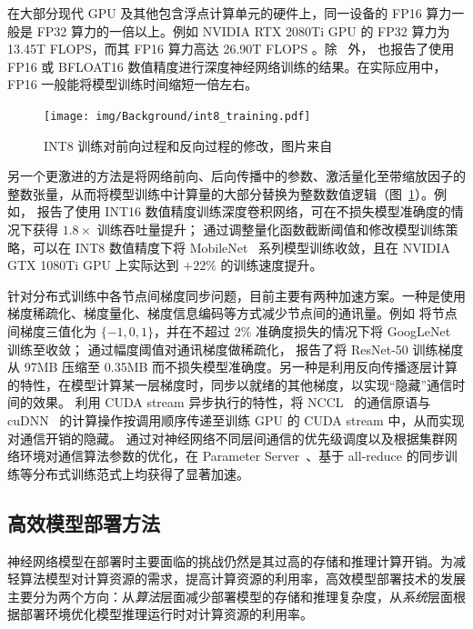 \documentclass[
  fontset = mac,
]{shtthesis}
\begin{document}
在大部分现代 GPU 及其他包含浮点计算单元的硬件上，同一设备的 FP16 算力一般是 FP32 算力的一倍以上。例如 NVIDIA RTX 2080Ti GPU 的 FP32 算力为 13.45T FLOPS，而其 FP16 算力高达 26.90T FLOPS \citep{nvidia2018turing}。除~\citet{micikevicius2018mixed} 外，\citet{abadi2016tensorflow, dean2012large} 也报告了使用 FP16 或 BFLOAT16 数值精度进行深度神经网络训练的结果。在实际应用中，FP16 一般能将模型训练时间缩短一倍左右。

\begin{figure}[htb]
  \centering
  \texttt{[image: img/Background/int8\_training.pdf]}
  \caption{INT8 训练对前向过程和反向过程的修改，图片来自~\citet{zhu2019towards}}
  \label{img::background::int8_training}
\end{figure}

另一个更激进的方法是将网络前向、后向传播中的参数、激活量化至带缩放因子的整数张量，从而将模型训练中计算量的大部分替换为整数数值逻辑（图~\ref{img::background::int8_training}）。例如，\citet{das2018mixed} 报告了使用 INT16 数值精度训练深度卷积网络，可在不损失模型准确度的情况下获得 $1.8\times$ 训练吞吐量提升；\citet{zhu2019towards} 通过调整量化函数截断阈值和修改模型训练策略，可以在 INT8 数值精度下将 MobileNet~\citep{howard2017mobilenets, Sandler_2018} 系列模型训练收敛，且在 NVIDIA GTX 1080Ti GPU 上实际达到 $+22\%$ 的训练速度提升。

针对分布式训练中各节点间梯度同步问题，目前主要有两种加速方案。一种是使用梯度稀疏化、梯度量化、梯度信息编码等方式减少节点间的通讯量。例如 \citet{wen2017terngrad} 将节点间梯度三值化为 $\{-1, 0, 1\}$，并在不超过 $2\%$ 准确度损失的情况下将 GoogLeNet~\citep{szegedy2015going} 训练至收敛；\citet{aji2017sparse, lin2018deep} 通过幅度阈值对通讯梯度做稀疏化，\citet{lin2018deep} 报告了将 ResNet-50 训练梯度从 97MB 压缩至 0.35MB 而不损失模型准确度。另一种是利用反向传播逐层计算的特性，在模型计算某一层梯度时，同步以就绪的其他梯度，以实现“隐藏”通信时间的效果。\citet{abadi2016tensorflow, paszke2019pytorch} 利用 CUDA stream 异步执行的特性，将 NCCL~\citep{jeaugey2017nccl} 的通信原语与 cuDNN~\citep{chetlur2014cudnn} 的计算操作按调用顺序传递至训练 GPU 的 CUDA stream 中，从而实现对通信开销的隐藏。\citet{peng2019generic} 通过对神经网络不同层间通信的优先级调度以及根据集群网络环境对通信算法参数的优化，在 Parameter Server~\citep{li2014scaling}、基于 all-reduce 的同步训练等分布式训练范式上均获得了显著加速。
\subsection{高效模型部署方法}
神经网络模型在部署时主要面临的挑战仍然是其过高的存储和推理计算开销。为减轻算法模型对计算资源的需求，提高计算资源的利用率，高效模型部署技术的发展主要分为两个方向：从\emph{算法}层面减少部署模型的存储和推理复杂度，从\emph{系统}层面根据部署环境优化模型推理运行时对计算资源的利用率。
\end{document}
